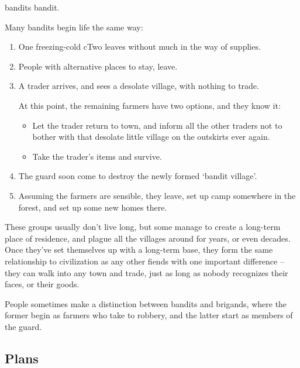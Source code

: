 \begin{multicols}{2}

\noindent
\Glspl{bandit} \glsdesc{bandit}.

Many bandits begin life the same way:

\begin{enumerate}
  \item
  One freezing-cold \gls{cTwo} leaves  without much in the way of supplies.
  \item
  People with alternative places to stay, leave.
  \item
  A trader arrives, and sees a desolate \gls{village}, with nothing to trade.

  At this point, the remaining farmers have two options, and they know it:
  \begin{itemize}
    \item
    Let the trader return to town, and inform all the other traders not to bother with that desolate little \gls{village} on the outskirts ever again.
    \item
    Take the trader's items and survive.
  \end{itemize}
  \item
  The \gls{guard} soon come to destroy the newly formed `bandit \gls{village}'.
  \item
  Assuming the farmers are sensible, they leave, set up camp somewhere in the forest, and set up some new homes there.
\end{enumerate}

These groups usually don't live long, but some manage to create a long-term place of residence, and plague all the \glspl{village} around for years, or even decades.
Once they've set themselves up with a long-term base, they form the same relationship to civilization as any other \glspl{fiend} with one important difference -- they can walk into any town and trade, just as long as nobody recognizes their faces, or their goods.

People sometimes make a distinction between bandits and brigands, where the former begin as farmers who take to robbery, and the latter start as members of the \gls{guard}.



\subsection{Plans}


\end{multicols}
